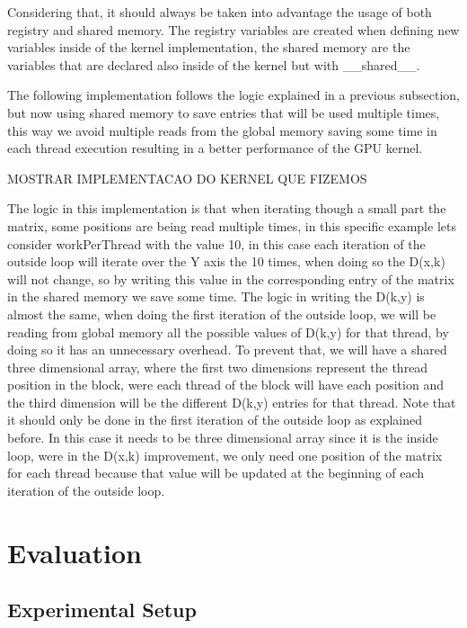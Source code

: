 \documentclass[runningheads]{llncs}
\begin{document}
Considering that, it should always be taken into advantage the usage of both registry and shared memory. The registry variables are created when defining
new variables inside of the kernel implementation, the shared memory are the variables that are declared also inside of the kernel but with \_\_shared\_\_.

The following implementation follows the logic explained in a previous subsection, but now using shared memory to save entries that will be used 
multiple times, this way we avoid multiple reads from the global memory saving some time in each thread execution resulting in a better performance of the GPU kernel.

MOSTRAR IMPLEMENTACAO DO KERNEL QUE FIZEMOS

The logic in this implementation is that when iterating though a small part the matrix, some positions are being read multiple times, in this specific 
example lets consider workPerThread with the value 10, in this case each iteration of the outside loop will iterate over the Y axis the 10 times, when 
doing so the D(x,k) will not change, so by writing this value in the corresponding entry of the matrix in the shared memory we save some time. The logic 
in writing the D(k,y) is almost the same, when doing the first iteration of the outside loop, we will be reading from global memory all the possible 
values of D(k,y) for that thread, by doing so it has an unnecessary overhead. To prevent that, we will have a shared three dimensional array, where the 
first two dimensions represent the thread position in the block, were each thread of the block will have each position and the third dimension will be 
the different D(k,y) entries for that thread. Note that it should only be done in the first iteration of the outside loop as explained before. 
In this case it needs to be three dimensional array since it is the inside loop, were in the D(x,k) improvement, we only need one position of the matrix 
for each thread because that value will be updated at the beginning of each iteration of the outside loop.

\section{Evaluation}

\subsection{Experimental Setup}
\end{document}
